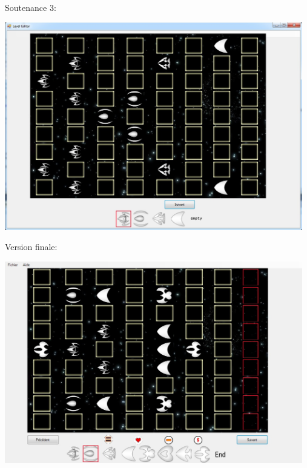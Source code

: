\begin{center}
	\par Soutenance 3:
	\par \includegraphics[width=13cm]{images/leveleditor2.jpg}
	\vspace{1cm}
	\par Version finale:
	\par \includegraphics[width=13cm]{images/leveleditor.jpg}
\end{center}